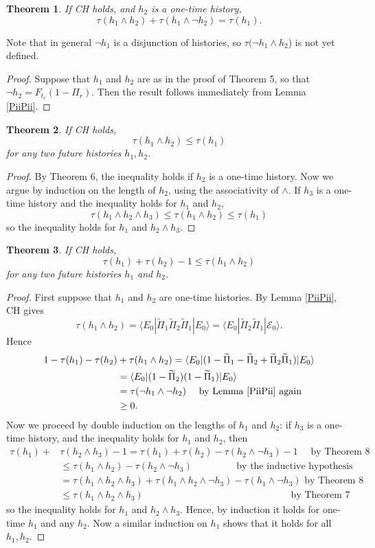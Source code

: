 \documentclass[12pt,a4paper,reqno]{article}
\newcommand{\upline}{\vspace{-1.2\abovedisplayskip}}
\renewcommand{\(}{\left(}
\renewcommand{\)}{\right)}
\newcommand{\E}{\mathcal{E}}
\newcommand{\<}{\langle}
\renewcommand{\>}{\rangle}
\newcommand{\qqquad}{\quad\quad\quad}
\newcommand{\be}{\begin{equation}}
\newcommand{\ee}{\end{equation}}
\newcommand{\Pii}{\widetilde{\Pi}}
\theoremstyle{plain} %
\newtheorem{thm}{Theorem}
\begin{document}
\begin{thm}\label{hnoth} If CH holds, and $h_2$ is a one-time history,
\[
\tau(h_1\land h_2) + \tau(h_1\land\lnot h_2) = \tau (h_1).
\]
\end{thm}
Note that in general $\lnot h_1$ is a disjunction of histories, so $\tau(\lnot h_1\land h_2$) is not yet defined.
\begin{proof}
Suppose that $h_1$ and $h_2$ are as in the proof of Theorem 5, so that 
$\lnot h_2 = F_{t_r}(1 - \Pi_r)$. Then the result follows immediately from Lemma \ref{PiiPii}.
\end{proof}

\begin{thm} If CH holds,
\[
\tau(h_1\land h_2) \le \tau(h_1)
\]
for any two future histories $h_1, h_2$.
\end{thm}
\begin{proof}
By Theorem 6, the inequality holds if $h_2$ is a one-time history. Now we argue by induction on the length of $h_2$, using the associativity of $\land$. If $h_3$ is a one-time history and the inequality holds for $h_1$ and $h_2$,
\[
\tau(h_1\land h_2\land h_3) \le \tau(h_1\land h_2) \le \tau(h_1)
\]
so the inequality holds for $h_1$ and $h_2\land h_3$.
\end{proof} 

\begin{thm}\label{tauineq} If CH holds,
\[
\tau(h_1) + \tau(h_2) - 1 \le \tau(h_1\land h_2)
\]
for any two future histories $h_1$ and $h_2$.
\end{thm}
\begin{proof}
First suppose that $h_1$ and $h_2$ are one-time histories. By Lemma \ref{PiiPii}, CH gives
\be\label{twopi}
\tau(h_1\land h_2) = \<E_0|\Pii_1\Pii_2\Pii_1|E_0\> = \<E_0|\Pii_2\Pii_1|\E_0\>.
\ee
Hence\upline
\begin{align*}
1 - \tau(h_1) - \tau(h_2) &+ \tau(h_1\land h_2) = \<E_0|(1 - \Pii_1 - \Pii_2 + \Pii_2\Pii_1)|E_0\> \\
&= \<E_0|(1-\Pii_2)(1-\Pii_1)|E_0\>\\
&= \tau(\lnot h_1\land\lnot h_2) \quad\text{ by Lemma \ref{PiiPii} again}\\
&\ge 0.
\end{align*}
Now we proceed by double induction on the lengths of $h_1$ and $h_2$: if $h_3$ is a one-time history, and the inequality holds for $h_1$ and $h_2$, then
\begin{align*}
\tau(h_1) + {} &\tau(h_2\land h_3) - 1 = \tau(h_1) + \tau(h_2) - \tau(h_2\land \lnot h_3) - 1 \quad\text{ by Theorem 8}\\
&\le \tau(h_1\land h_2) - \tau(h_2\land\lnot h_3) \;\quad\quad\quad\quad \text{ by the inductive hypothesis}\\
&= \tau(h_1\land h_2\land h_3) + \tau(h_1\land h_2\land \lnot h_3) - \tau(h_1\land \lnot h_3) \text{ by Theorem 8}\\
&\le \tau(h_1\land h_2\land h_3) \qqquad\qqquad\qqquad\qqquad\qqquad\text{ by Theorem 7}
\end{align*}
so the inequality holds for $h_1$ and $h_2\land h_3$. Hence, by induction it holds for one-time $h_1$ and any $h_2$. Now a similar induction on $h_1$ shows that it holds for all $h_1,h_2$.
\end{proof} 
\end{document}
